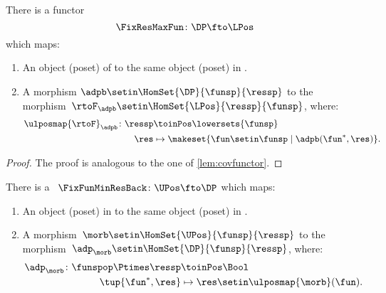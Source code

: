 \begin{lemma}
    \label{lem:confunctor}
    There is a functor
    \begin{equation}
        \FixResMaxFun\colon \DP \fto \LPos
    \end{equation}
    which maps:
    \begin{enumerate}
        \item An object (poset) of \DP to the same object (poset) in \LPos.
        \item A morphism $\adpb \setin \HomSet{\DP}{\funsp}{\ressp}$ to the morphism~$\rtoF_\adpb\setin \HomSet{\LPos}{\ressp}{\funsp}$, where:
              \begin{equation}
                  \begin{aligned}
                      \ulposmap{\rtoF}_\adpb\colon \ressp & \toinPos \lowersets{\funsp} \\
                      \res                                & \mapsto \makeset{ \fun \setin \funsp \mid \adpb(\fun^*,\res)}.
                  \end{aligned}
              \end{equation}
    \end{enumerate}
\end{lemma}

\begin{proof}
    The proof is analogous to the one of \cref{lem:covfunctor}.
\end{proof}

\begin{lemma}
    \label{lem:covfunctorback}
    There is a ~$\FixFunMinResBack\colon \UPos \fto \DP$ which maps:
    \begin{enumerate}
        \item An object (poset) in \UPos to the same object (poset) in \DP.
        \item A morphism~$\morb\setin \HomSet{\UPos}{\funsp}{\ressp}$ to the morphism~$\adp_\morb \setin \HomSet{\DP}{\funsp}{\ressp}$, where:
              \begin{equation}
                  \begin{aligned}
                      \adp_\morb\colon \funspop \Ptimes \ressp & \toinPos \Bool \\
                      \tup{\fun^*,\res}                        & \mapsto \res \setin \ulposmap{\morb}(\fun).
                  \end{aligned}
              \end{equation}
    \end{enumerate}
\end{lemma}

